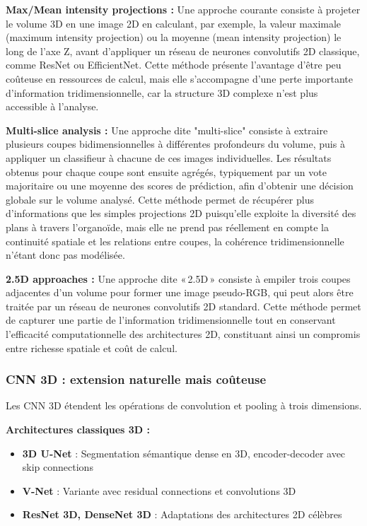 \textbf{Max/Mean intensity projections :}
Une approche courante consiste à projeter le volume 3D en une image 2D en calculant, par exemple, la valeur maximale (maximum intensity projection) ou la moyenne (mean intensity projection) le long de l’axe Z, avant d’appliquer un réseau de neurones convolutifs 2D classique, comme ResNet ou EfficientNet. Cette méthode présente l’avantage d’être peu coûteuse en ressources de calcul, mais elle s’accompagne d’une perte importante d’information tridimensionnelle, car la structure 3D complexe n’est plus accessible à l’analyse.

\textbf{Multi-slice analysis :}
Une approche dite "multi-slice" consiste à extraire plusieurs coupes bidimensionnelles à différentes profondeurs du volume, puis à appliquer un classifieur à chacune de ces images individuelles. Les résultats obtenus pour chaque coupe sont ensuite agrégés, typiquement par un vote majoritaire ou une moyenne des scores de prédiction, afin d’obtenir une décision globale sur le volume analysé. Cette méthode permet de récupérer plus d’informations que les simples projections 2D puisqu’elle exploite la diversité des plans à travers l’organoïde, mais elle ne prend pas réellement en compte la continuité spatiale et les relations entre coupes, la cohérence tridimensionnelle n’étant donc pas modélisée.

\textbf{2.5D approaches :}
Une approche dite « 2.5D » consiste à empiler trois coupes adjacentes d’un volume pour former une image pseudo-RGB, qui peut alors être traitée par un réseau de neurones convolutifs 2D standard. Cette méthode permet de capturer une partie de l’information tridimensionnelle tout en conservant l’efficacité computationnelle des architectures 2D, constituant ainsi un compromis entre richesse spatiale et coût de calcul.

\subsubsection{CNN 3D : extension naturelle mais coûteuse}

Les CNN 3D étendent les opérations de convolution et pooling à trois dimensions.

\textbf{Architectures classiques 3D :}
\begin{itemize}
    \item \textbf{3D U-Net} : Segmentation sémantique dense en 3D, encoder-decoder avec skip connections
    \item \textbf{V-Net} : Variante avec residual connections et convolutions 3D
    \item \textbf{ResNet 3D, DenseNet 3D} : Adaptations des architectures 2D célèbres
\end{itemize}

